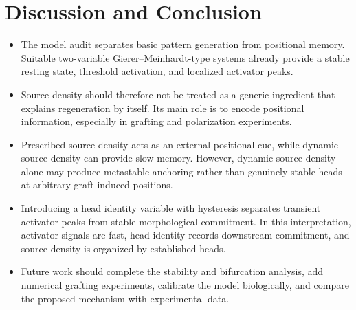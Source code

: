 \section{Discussion and Conclusion}

\begin{itemize}
    \item The model audit separates basic pattern generation from positional memory. Suitable two-variable Gierer--Meinhardt-type systems already provide a stable resting state, threshold activation, and localized activator peaks.
    \item Source density should therefore not be treated as a generic ingredient that explains regeneration by itself. Its main role is to encode positional information, especially in grafting and polarization experiments.
    \item Prescribed source density acts as an external positional cue, while dynamic source density can provide slow memory. However, dynamic source density alone may produce metastable anchoring rather than genuinely stable heads at arbitrary graft-induced positions.
    \item Introducing a head identity variable with hysteresis separates transient activator peaks from stable morphological commitment. In this interpretation, activator signals are fast, head identity records downstream commitment, and source density is organized by established heads.
    \item Future work should complete the stability and bifurcation analysis, add numerical grafting experiments, calibrate the model biologically, and compare the proposed mechanism with experimental data.
\end{itemize}
